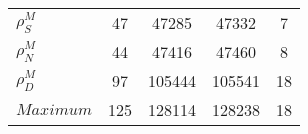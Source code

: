 \begin{center}
\begin{longtable}{lcccc}
$ {\rho^{M}_{S}}       $	 & 	                   47	 & 	                47285	 & 	                47332	 & 	                    7 \\ 
$ {\rho^{M}_{N}}       $	 & 	                   44	 & 	                47416	 & 	                47460	 & 	                    8 \\ 
$ {\rho^{M}_{D}}       $	 & 	                   97	 & 	               105444	 & 	               105541	 & 	                   18 \\ 
$Maximum               $	 & 	                  125	 & 	               128114	 & 	               128238	 & 	                   18 \\ 
\end{longtable}
 \end{center}
